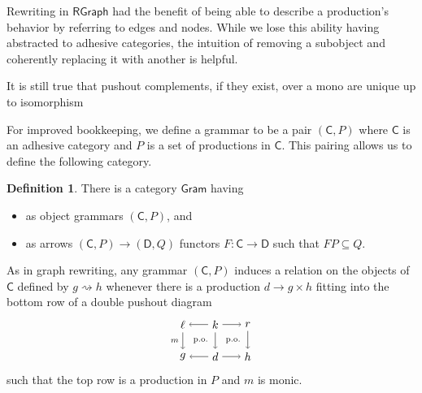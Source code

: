 \documentclass{amsart}
\newcommand{\C}{\cat{C}}
\newcommand{\D}{\cat{D}}
\newcommand{\RGraph}{\cat{RGraph}}
\newcommand{\Gram}{\cat{Gram}}
\newcommand{\cat}[1]{\mathsf{#1}}
\newcommand{\from}{\colon}
\newcommand{\dderiv}[2]{#1 \rightsquigarrow #2}
\newcommand{\deriv}[2]{#1 \rightsquigarrow^\ast #2}
\newcommand{\spn}[3]{#2 \to #1 \times #3}
\theoremstyle{remark}
\theoremstyle{definition}
\newtheorem{definition}[theorem]{Definition}
\begin{document}
Rewriting in $ \RGraph $ had the benefit of being able to describe a
production's behavior by referring to edges and nodes. While we lose
this ability having abstracted to adhesive categories, the intuition
of removing a subobject and coherently replacing it with another
is helpful.

It is still true that pushout complements, if they exist, over a mono
are unique up to isomorphism \cite[Lem.~15]{LackSobo_Adhesive}

For improved bookkeeping, we define a grammar to be a pair
$ ( \C , P) $ where $ \C $ is an adhesive category and $ P $ is a set
of productions in $ \C $. This pairing allows us to define the
following category.

\begin{definition}
  There is a category $ \Gram $ having
  \begin{itemize}
  \item as object grammars $ ( \C , P ) $, and
  \item as arrows $ ( \C , P ) \to ( \D , Q ) $ functors $ F \from
    \C \to \D $ such that $ FP \subseteq Q $.
  \end{itemize}
\end{definition}

As in graph rewriting, any grammar $ ( \C , P ) $ induces a relation
on the objects of $ \C $ defined by $ \dderiv{g}{h} $ whenever there
is a production $ \spn{g}{d}{h} $ fitting into the bottom row of a
double pushout diagram
%
\[
  \begin{tikzpicture}
    \node (1) at (0,1) {\( \ell \)};
    \node (2) at (1,1) {\( k \)};
    \node (3) at (2,1) {\( r \)};
    \node (4) at (0,0) {\( g \)};
    \node (5) at (1,0) {\( d \)};
    \node (6) at (2,0) {\( h \)};
    \draw [->] (2) to node [] {\scriptsize{\( \)}} (1);
    \draw [->] (2) to node [] {\scriptsize{\( \)}} (3);
    \draw [->] (5) to node [] {\scriptsize{\( \)}} (4);
    \draw [->] (5) to node [] {\scriptsize{\( \)}} (6);
    \draw [->] (1) to node [left] {\scriptsize{\( m \)}} (4);
    \draw [->] (2) to node [] {\scriptsize{\( \)}} (5);
    \draw [->] (3) to node [] {\scriptsize{\( \)}} (6);
    \node () at (0.5,0.5) {\scriptsize{ p.o.\ }};
    \node () at (1.5,0.5) {\scriptsize{ p.o.\ }};
  \end{tikzpicture}
\]
% 
such that the top row is a production in $ P $ and $ m $ is monic.

\end{document}
